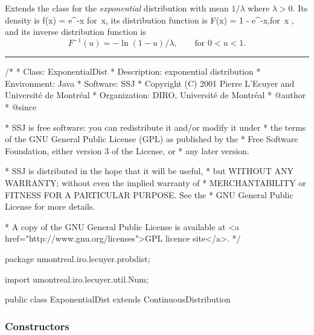 
Extends the class  for
the {\em exponential\/} distribution \cite[page 494]{tJOH95a}
with mean $1/\lambda$ where $\lambda > 0$.
Its density is
\eq  f(x) = \lambda e^{-\lambda x}
     \qquad \mbox{for }x,          
\endeq
its distribution function is
\eq
   F(x) = 1 - e^{-\lambda x},\qquad \mbox{for }x ,
\endeq
and its inverse distribution function is
\[
  F^{-1}(u) = -\ln (1-u)/\lambda, \qquad  \mbox{for } 0 < u < 1.
\]

\bigskip\hrule

\begin{code}
\begin{hide}
/*
 * Class:        ExponentialDist
 * Description:  exponential distribution
 * Environment:  Java
 * Software:     SSJ 
 * Copyright (C) 2001  Pierre L'Ecuyer and Université de Montréal
 * Organization: DIRO, Université de Montréal
 * @author       
 * @since

 * SSJ is free software: you can redistribute it and/or modify it under
 * the terms of the GNU General Public License (GPL) as published by the
 * Free Software Foundation, either version 3 of the License, or
 * any later version.

 * SSJ is distributed in the hope that it will be useful,
 * but WITHOUT ANY WARRANTY; without even the implied warranty of
 * MERCHANTABILITY or FITNESS FOR A PARTICULAR PURPOSE.  See the
 * GNU General Public License for more details.

 * A copy of the GNU General Public License is available at
   <a href="http://www.gnu.org/licenses">GPL licence site</a>.
 */
\end{hide}
package umontreal.iro.lecuyer.probdist;
\begin{hide}
import  umontreal.iro.lecuyer.util.Num;\end{hide}

public class ExponentialDist extends ContinuousDistribution\begin{hide} {
   private double lambda;
\end{hide}
\end{code}
\subsubsection* {Constructors}

